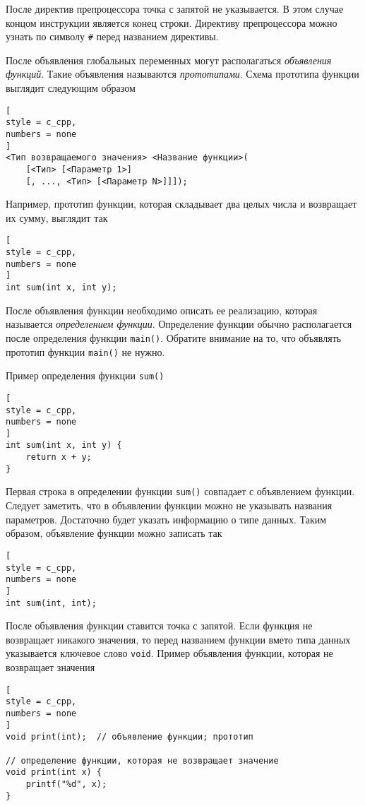 \documentclass[%
	11pt,
	a4paper,
	utf8,
		]{article}
\begin{document}
После директив препроцессора точка с запятой не указывается. В этом случае концом инструкции является конец строки. Директиву препроцессора можно узнать по символу \verb|#| перед названием директивы. 

После объявления глобальных переменных могут располагаться \emph{объявления функций}. Такие объявления называются \emph{прототипами}. Схема прототипа функции выглядит следующим образом
\begin{lstlisting}[
style = c_cpp,
numbers = none
]
<Тип возвращаемого значения> <Название функции>(
    [<Тип> [<Параметр 1>]
    [, ..., <Тип> [<Параметр N>]]]);
\end{lstlisting}

Например, прототип функции, которая складывает два целых числа и возвращает их сумму, выглядит так
\begin{lstlisting}[
style = c_cpp,
numbers = none
]
int sum(int x, int y);
\end{lstlisting}

После объявления функции необходимо описать ее реализацию, которая называется \emph{определением функции}. Определение функции обычно располагается после определения функции \verb|main()|. Обратите внимание на то, что объявлять прототип функции \verb|main()| не нужно.

Пример определения функции \verb|sum()|
\begin{lstlisting}[
style = c_cpp,
numbers = none
]
int sum(int x, int y) {
    return x + y;
}
\end{lstlisting}

Первая строка в определении функции \verb|sum()| совпадает с объявлением функции. Следует заметить, что в объявлении функции можно не указывать названия параметров. Достаточно будет указать информацию о типе данных. Таким образом, объявление функции можно записать так
\begin{lstlisting}[
style = c_cpp,
numbers = none
]
int sum(int, int);
\end{lstlisting}

После объявления функции ставится точка с запятой. Если функция не возвращает никакого значения, то перед названием функции вмето типа данных указывается ключевое слово \verb|void|. Пример объявления функции, которая не возвращает значения
\begin{lstlisting}[
style = c_cpp,
numbers = none
]
void print(int);  // объявление функции; прототип

// определение функции, которая не возвращает значение
void print(int x) {
    printf("%d", x);
}
\end{lstlisting}
\end{document}
